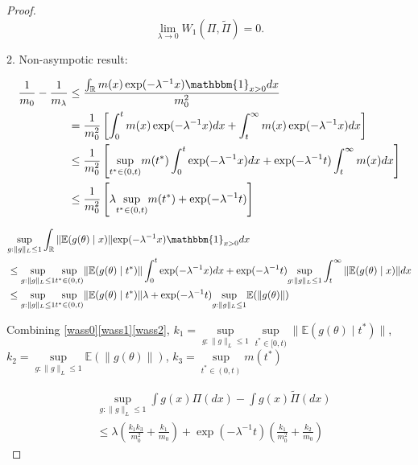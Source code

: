 \documentclass[10pt]{article}
\DeclareMathOperator{\1}{\mathbbm{1}}
\begin{document}
\begin{proof}[Proof]
	  
	
	\begin{equation}
 \underset{\lambda \rightarrow 0}\lim W_1(\Pi,\tilde\Pi)=0.	  \end{equation}
	  
	  2. Non-asympotic result:
	

	\begin{equation}
	\label{wass1}
	\begin{aligned}
	\frac{1}{m_0}-\frac{1}{m_\lambda} & \le  \frac{   \int_\mathbb{R}  m(x) \exp(- \lambda^{-1} x ) \mathbbm{1}_{x > 0}  d x } {  m_0^2}  \\
	&= \frac{1}{ m_0^2} \left[ \int_0^{t}  m(x) \exp(- \lambda^{-1} x ) dx + \int_t^{\infty}  m(x) \exp(- \lambda^{-1} x ) dx \right] \\
	&\le \frac{1}{ m_0^2} \left[  \underset{t^*\in (0,t)}\sup m(t^{*})\int_0^{t} \exp(- \lambda^{-1} x ) dx + \exp(- \lambda^{-1} t )\int_t^{\infty}  m(x) dx  \right] \\
	&\le \frac{1}{ m_0^2} \left[\lambda \underset{t^*\in (0,t)}\sup  m(t^{*})  + \exp(- \lambda^{-1} t ) \right] 
	\end{aligned}
\end{equation}

	\begin{equation}
		\label{wass2}
	\begin{aligned}
	 & \underset{g:\|g\|_L\le 1}\sup\int_\mathbb{R}  \|\mathbb{E}(g(\theta) \mid x)\| { \exp(- \lambda^{-1} x)}	\mathbbm{1}_{x > 0} d x \\
	&\le \underset{g:\|g\|_L\le 1}\sup\underset{t^*\in (0,t)}\sup \|\mathbb{E}(g(\theta) \mid t^*)\|	
	\int_0^{t} \exp(- \lambda^{-1} x ) dx + \exp(- \lambda^{-1} t ) \underset{g:\|g\|_L\le 1}\sup \int_t^{\infty}   \|\mathbb{E}( g(\theta )\mid x)\| dx \\
&\le \underset{g:\|g\|_L\le 1}\sup\underset{t^*\in (0,t)}\sup \|\mathbb{E}(g(\theta) \mid t^*)\|	\lambda + \exp(- \lambda^{-1} t ) \underset{g:\|g\|_L\le 1} \sup \mathbb{E}(\| g(\theta )\|) \\
	\end{aligned}
\end{equation}

Combining \eqref{wass0}\eqref{wass1}\eqref{wass2}, $k_1=\underset{g:\|g\|_L\le 1}\sup\underset{t^*\in [0,t)}\sup \|\mathbb{E}(g(\theta) \mid t^*)\|$, $k_2=\underset{g:\|g\|_L\le 1} \sup \mathbb{E}(\| g(\theta )\|)$, $k_3= \underset{t^*\in (0,t)}\sup  m(t^{*})$


\begin{equation}
\begin{aligned}
& \underset{g:\|g\|_L\le 1}\sup \int g(x) \Pi(dx) -  \int g(x) \tilde\Pi(dx) \\
	& \le \lambda (\frac{k_1 k_3}{m_0^2} + \frac{k_1}{m_0}) + \exp(- \lambda^{-1} t )(\frac{k_1}{m_0^2} + \frac{k_2}{m_0})
\end{aligned}
\end{equation}


\end{proof}
\end{document}

